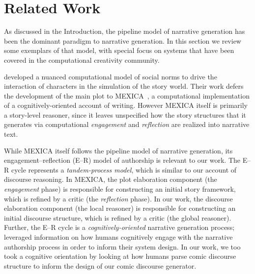 \section{Related Work}

As discussed in the Introduction, the pipeline model of narrative generation 
has been the dominant paradigm to narrative generation. In this section we
review some exemplars of that model, with special focus on systems that have
been covered in the computational creativity community.

 developed a nuanced computational model of social
norms to drive the interaction of characters in the simulation of the story
world. Their work defers the development of the main plot to
MEXICA~\cite{perez2001mexica}, a computational implementation of a
cognitively-oriented account of writing. However MEXICA itself is primarily a
story-level reasoner, since it leaves unspecified how the story structures that
it generates via computational \emph{engagement} and \emph{reflection} are 
realized into narrative text. 

While MEXICA itself follows the pipeline model of narrative generation, its
engagement--reflection (E--R) model of authorship is relevant to our work. 
The E--R cycle represents a \emph{tandem-process model}, which is similar to our 
account of discourse reasoning. In MEXICA, the plot
elaboration component (the \emph{engagement} phase) is responsible for 
constructing an initial story framework, which is refined by a critic (the
\emph{reflection} phase). In our work, the discourse elaboration component
(the local reasoner) is responsible for constructing an initial discourse
structure, which is refined by a critic (the global reasoner).  Further, 
the E--R cycle is a \emph{cognitively-oriented} narrative generation process;
\citeauthor{perez2001mexica} leveraged information on how humans cognitively 
engage with the narrative authorship process in order to inform their system 
design. In our work, we too took a cognitive orientation by looking at how 
humans parse comic discourse structure to inform the design of our comic 
discourse generator.


